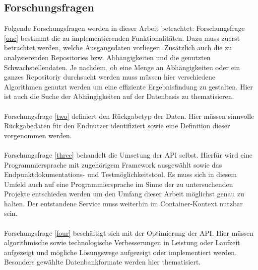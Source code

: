 \subsection{Forschungsfragen} \label{sec:Forschungsfragen}
    Folgende Forschungsfragen werden in dieser Arbeit betrachtet:
    Forschungsfrage \ref{one} bestimmt die zu implementierenden Funktionalitäten.
    Dazu muss zuerst betrachtet werden, welche Ausgangsdaten vorliegen.
    Zusätzlich auch die zu analysierenden Repositories bzw. Abhängigkeiten und die genutzten Schwachstellendaten.
    Je nachdem, ob eine Menge an Abhängigkeiten oder ein ganzes Repositoriy durchsucht werden muss müssen hier verschiedene Algorithmen genutzt werden um eine effiziente Ergebnisfindung zu gestalten.
    Hier ist auch die Suche der Abhängigkeiten auf der Datenbasis zu thematisieren. 
    \\ \\
    Forschungsfrage \ref{two} definiert den Rückgabetyp der Daten.
    Hier müssen sinnvolle Rückgabedaten für den Endnutzer identifiziert sowie eine Definition dieser vorgenommen werden.
    \\ \\
    Forschungsfrage \ref{three} behandelt die Umsetung der API selbst.
    Hierfür wird eine Programmiersprache mit zugehörigem Framework ausgewählt sowie das Endpunktdokumentations- und Testmöglichkeitstool.
    Es muss sich in diesem Umfeld auch auf eine Programmiersprache im Sinne der zu untersuchenden Projekte entschieden werden um den Umfang dieser Arbeit möglichst genau zu halten.
    Der entstandene Service muss weiterhin im Container-Kontext nutzbar sein.
    \\ \\
    Forschungsfrage \ref{four} beschäftigt sich mit der Optimierung der API.
    Hier müssen algorithmische sowie technologische Verbesserungen in Leistung oder Laufzeit aufgezeigt und mögliche Lösungswege aufgezeigt oder implementiert werden.
    Besonders gewählte Datenbankformate werden hier thematisiert.